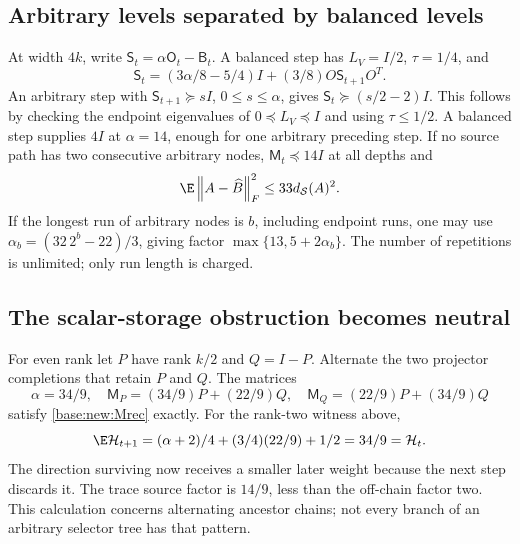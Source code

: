 \documentclass[11pt,oneside,openany,a4paper]{book}
\numberwithin{equation}{chapter}
\theoremstyle{definition}
\theoremstyle{remark}
\newcommand{\F}[1]{\left\lVert#1\right\rVert_F}
\begin{document}
\subsection{Arbitrary levels separated by balanced levels}
At width $4k$, write $\mathsf S_t=\alpha\mathsf O_t-\mathsf B_t$. A balanced step has $L_V=I/2$, $\tau=1/4$, and
\[
 \mathsf S_t=(3\alpha/8-5/4)I+(3/8)O\mathsf S_{t+1}O^T.
\]
An arbitrary step with $\mathsf S_{t+1}\succeq sI$, $0\le s\le\alpha$, gives
$\mathsf S_t\succeq(s/2-2)I$. This follows by checking the endpoint eigenvalues of $0\preceq L_V\preceq I$ and using $\tau\le1/2$. A balanced step supplies $4I$ at $\alpha=14$, enough for one arbitrary preceding step. If no source path has two consecutive arbitrary nodes, $\mathsf M_t\preceq14I$ at all depths and
\begin{equation}\label{base:new:33}
 \E\F{A-\widehat B}^2\le33d_{\mathcal S}(A)^2.
\end{equation}
If the longest run of arbitrary nodes is $b$, including endpoint runs, one may use
$\alpha_b=(32\,2^b-22)/3$, giving factor $\max\{13,5+2\alpha_b\}$. The number of repetitions is unlimited; only run length is charged.

\subsection{The scalar-storage obstruction becomes neutral}
For even rank let $P$ have rank $k/2$ and $Q=I-P$. Alternate the two projector completions that retain $P$ and $Q$. The matrices
\[
 \alpha=34/9,\quad
 \mathsf M_P=(34/9)P+(22/9)Q,\quad
 \mathsf M_Q=(22/9)P+(34/9)Q
\]
satisfy \eqref{base:new:Mrec} exactly. For the rank-two witness above,
\[
 \E\mathcal H_{t+1}=(\alpha+2)/4+(3/4)(22/9)+1/2=34/9=\mathcal H_t.
\]
The direction surviving now receives a smaller later weight because the next step discards it. The trace source factor is $14/9$, less than the off-chain factor two. This calculation concerns alternating ancestor chains; not every branch of an arbitrary selector tree has that pattern.
\end{document}
